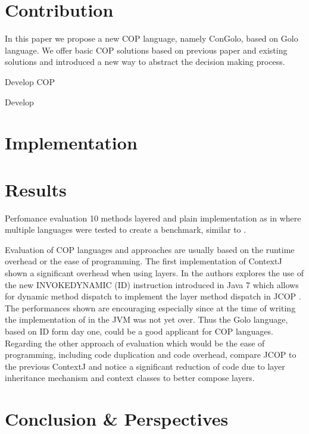 \documentclass[a4paper]{article}
\begin{document}
 
\section{Contribution}
\label{section:contribution}

In this paper we propose a new COP language, namely ConGolo, based on Golo language. We offer basic COP solutions based on previous paper and existing solutions and introduced a new way to abstract the decision making process.

Develop COP

Develop 


\section{Implementation}
\label{section:implementation}

\section{Results}
\label{section:results}

Perfomance evaluation
10 methods layered and plain implementation as in \cite{appeltauer_comparison_2009} where multiple languages were tested to create a benchmark, similar to \cite{kamina_eventcj:_2011}.

Evaluation of COP languages and approaches are usually based on the runtime overhead or the ease of programming. The first implementation of ContextJ \cite{haupt_contextj:_2011} shown a significant overhead when using layers. In \cite{appeltauer_layered_2010} the authors explores the use of the new INVOKEDYNAMIC (ID) instruction introduced in Java 7 which allows for dynamic method dispatch to implement the layer method dispatch in JCOP \cite{appeltauer_declarative_2013}. The performances shown are encouraging especially since at the time of writing the implementation of in the JVM was not yet over. Thus the Golo language, based on ID form day one, could be a good applicant for COP languages. Regarding the other approach of evaluation which would be the ease of programming, including code duplication and code overhead, \cite{appeltauer_declarative_2013} compare JCOP to the previous ContextJ and notice a significant reduction of code due to layer inheritance mechanism and context classes to better compose layers.

\section{Conclusion \& Perspectives}
\label{section:conclusion}


%
%



\end{document}
